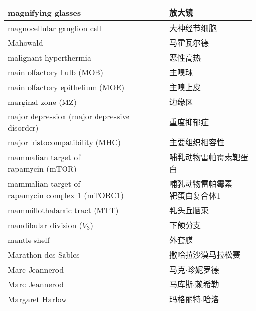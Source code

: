 \begin{longtable}{lll}
	\midrule
	magnifying glasses   && 放大镜  \\
	
	\midrule
	magnocellular ganglion cell   && 大神经节细胞  \\
	
	\midrule
	Mahowald   && 马霍瓦尔德  \\
	
	\midrule
	malignant hyperthermia   && 恶性高热  \\
	
	\midrule
	main olfactory bulb (MOB) && 主嗅球  \\
	
	\midrule
	main olfactory epithelium (MOE)  && 主嗅上皮  \\
	
	\midrule
	marginal zone (MZ)   && 边缘区  \\
	
	\midrule
	major depression (major depressive disorder)   && 重度抑郁症  \\
	
	\midrule
	major histocompatibility (MHC)   && 主要组织相容性  \\
	
	\midrule
	\makecell[l]{mammalian target of \\rapamycin (mTOR)}   && 哺乳动物雷帕霉素靶蛋白  \\
	
	\midrule
	\makecell[l]{mammalian target of \\rapamycin complex 1 (mTORC1)}   && \makecell[l]{哺乳动物雷帕霉素\\靶蛋白复合体1}  \\
	
	\midrule
	mammillothalamic tract (MTT)  && 乳头丘脑束  \\
	
	\midrule
	mandibular division ($V_3$)   && 下颌分支  \\
	
	\midrule
	mantle shelf   && 外套膜  \\
	
	\midrule
	Marathon des Sables   && 撒哈拉沙漠马拉松赛  \\
	
	\midrule
	Marc Jeannerod   && 马克$\cdot$珍妮罗德  \\
	
	\midrule
	Marc Jeannerod   && 马库斯$\cdot$赖希勒  \\
	
	\midrule
	Margaret Harlow   && 玛格丽特$\cdot$哈洛  \\
	

\end{longtable}
